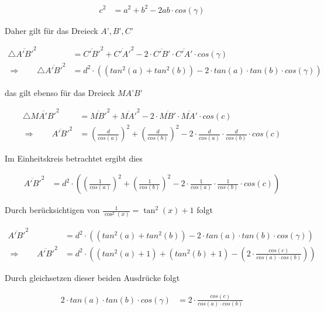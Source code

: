 \begin{refsection}
\begin{align*}
c^{ 2 } &= a^{ 2 } + b^{ 2 } - 2ab \cdot cos(\gamma)
\end{align*}

Daher gilt für das Dreieck $A’,B’,C’$

\begin{align*}
\triangle \overline{A'B'}^{ 2 } &= \overline{ C'B' }^{ 2 } + \overline{ C'A' }^{ 2 } - 2 \cdot \overline{C'B'} \cdot \overline{ C'A' } \cdot cos(\gamma) \\
\Rightarrow \quad \quad
\triangle \overline{A'B'}^{ 2 } &= d^{ 2 } \cdot \left(\left(tan^{ 2 }(a) + tan^{ 2 }(b)\right) - 2\cdot tan(a) \cdot tan(b) \cdot cos(\gamma)\right)
\end{align*}


das gilt ebenso für das Dreieck $MA’B’$

\begin{align*}
\triangle \overline{ MA'B' }^{ 2 } &= \overline{ MB' }^{ 2 } + \overline{ MA' }^{ 2 } - 2\cdot \overline{ MB'} \cdot \overline{ MA' } \cdot cos(c) \\
\Rightarrow \quad \quad
\overline{ A'B'}^{ 2 } &= \left(\frac{ d }{ cos(a) }  \right)^{ 2 } + \left(\frac{ d }{ cos(b)}  \right)^{ 2 } - 2 \cdot \frac{ d }{ cos(a)} \cdot \frac{ d }{ cos(b)} \cdot cos(c)
\end{align*}


Im Einheitskreis betrachtet ergibt dies

\begin{align*}
\overline{ A'B' }^{ 2 } &= d^{ 2 } \cdot \left(\left(\frac{ 1 }{ cos(a) }  \right)^{ 2 } + \left(\frac{ 1 }{ cos(b) }  \right)^{ 2 } - 2 \cdot \frac{ 1 }{ cos(a)} \cdot \frac{ 1 }{ cos(b)} \cdot cos(c)\right)
\end{align*}


Durch berücksichtigen von $\frac{1}{\cos^{2}(x)}=\tan^{2}(x)+1$ folgt

\begin{align*}
\overline{ A'B'}^{ 2 } &= d^{ 2 } \cdot \left(\left(tan^{ 2 }(a) + tan^{ 2 }(b)\right) - 2 \cdot tan(a) \cdot tan(b) \cdot cos(\gamma)\right) \\
\Rightarrow \quad \quad
\overline{ A'B'}^{ 2 } &= d^{ 2 } \cdot \left(\left(tan^{ 2 }(a) + 1\right) + \left(tan^{ 2 }(b) + 1\right) - \left(2 \cdot \frac{cos(c)}{cos(a) \cdot cos(b)}\right)\right)
\end{align*}


Durch gleichsetzen dieser beiden Ausdrücke folgt

\begin{align*}
2 \cdot tan(a) \cdot tan(b) \cdot cos(\gamma) &= 2 \cdot \frac{cos(c)}{cos(a) \cdot cos(b)}
\end{align*}



\end{refsection}
